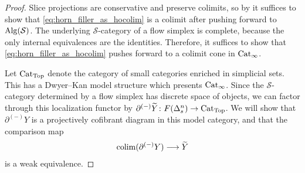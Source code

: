 \documentclass[10pt]{amsart}
\numberwithin{equation}{section}
\theoremstyle{definition}
\DeclareMathOperator{\Top}{Top}
\DeclareMathOperator*{\colim}{colim}
\newcommand{\Cat}{\mathrm{Cat}\vphantom{t}}
\newcommand{\Alg}{\mathrm{Alg}\vphantom{z}}
\newcommand{\cS}{\mathcal{S}}
\newcommand{\del}{\partial}
\renewcommand{\to}{\mathchoice{\longrightarrow}{\rightarrow}{}{}}
\begin{document}
\begin{proof}
	Slice projections are conservative and preserve colimits, so by  it suffices to show that \eqref{eq:horn_filler_as_hocolim} is a colimit after pushing forward to $\Alg(\cS)$.
	The underlying $\cS$-category of a flow simplex is complete, because the only internal equivalences are the identities.
  Therefore, it suffices to show that \eqref{eq:horn_filler_as_hocolim} pushes forward to a colimit cone in $\Cat_{\infty}$.

	Let $\Cat_{\Top}$ denote the category of small categories enriched in simplicial sets.
  This has a Dwyer--Kan model structure which presents $\Cat_{\infty}$.
  Since the $\cS$-category determined by a flow simplex has discrete space of objects, we can factor through this localization functor  by $\del^{(-)}\widetilde{Y}\colon F(\Delta^{n}_{s}) \to \Cat_{\Top}$.
  We will show that $\del^{(-)}Y$ is a projectively cofibrant diagram in this model category, and that the comparison map
	\begin{align*}
		\colim(\del^{(-)}Y) \to \widetilde{Y}
	\end{align*}
	is a weak equivalence.


\end{proof}
\end{document}
